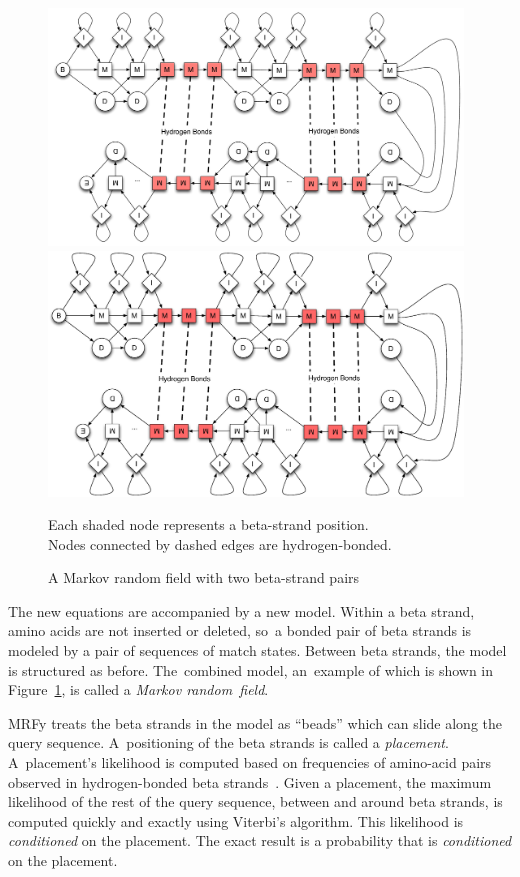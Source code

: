 \documentclass[]{jfp1}
\newcommand\figref[1]{Figure~\ref{fig:#1}}
\newcommand\figlabel[1]{\label{fig:#1}}
\let\cite\citep
\begin{document}
\begin{figure}
\ifpdfmadness
\centerline{\includegraphics[width=11cm]{mrf_interleave_diagram.pdf}} 
\else
\centerline{\includegraphics[width=11cm]{mrf_interleave_diagram.eps}} 
\fi
Each shaded node represents a beta-strand position.\\
Nodes connected by dashed edges are hydrogen-bonded.

\smallskip

\caption{A Markov random field with two beta-strand pairs}
\figlabel{mrf} 
\end{figure}



The new equations are accompanied by a new model.
Within a beta strand, amino acids are not inserted or deleted, so~a
bonded pair of beta strands is modeled by 
 a pair of sequences of match states.
Between beta strands, the model is structured as before.
The~combined model, an~example of which is shown in \figref{mrf}, is called a
\textit{Markov random~field}. 


%
%
MRFy treats the beta 
strands in the model
 as ``beads'' which can slide along the query sequence.
A~positioning of the beta strands is called
 a \emph{placement}.
A~placement's likelihood is computed
based on frequencies of amino-acid pairs observed in 
hydrogen-bonded beta strands~\cite{Cowen:2002p588}.
Given a placement, the maximum likelihood of the rest of
the query sequence, between and around beta strands,
is computed quickly and exactly 
using Viterbi's algorithm.
\ifpagetuning
This likelihood is \emph{conditioned} on the placement.
\else
The exact result is a probability that is
\emph{conditioned} on the placement.
\fi
\end{document}

